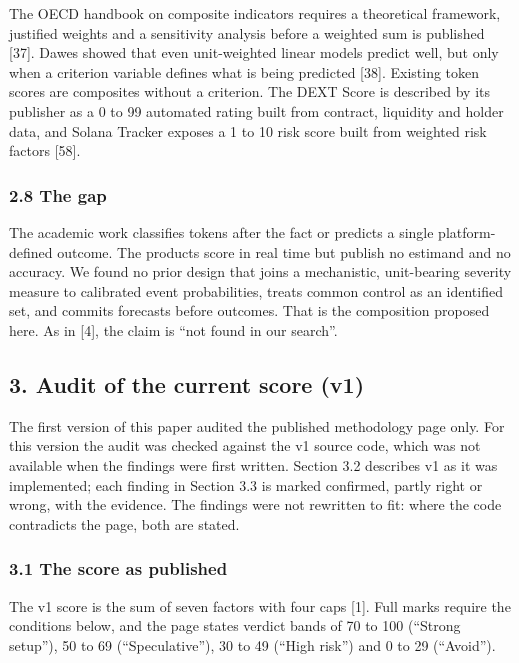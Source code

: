 The OECD handbook on composite indicators requires a theoretical framework, justified weights and a sensitivity analysis before a weighted sum is published {[}37{]}. Dawes showed that even unit-weighted linear models predict well, but only when a criterion variable defines what is being predicted {[}38{]}. Existing token scores are composites without a criterion. The DEXT Score is described by its publisher as a 0 to 99 automated rating built from contract, liquidity and holder data, and Solana Tracker exposes a 1 to 10 risk score built from weighted risk factors {[}58{]}.

\subsubsection{2.8 The gap}\label{the-gap}

The academic work classifies tokens after the fact or predicts a single platform-defined outcome. The products score in real time but publish no estimand and no accuracy. We found no prior design that joins a mechanistic, unit-bearing severity measure to calibrated event probabilities, treats common control as an identified set, and commits forecasts before outcomes. That is the composition proposed here. As in {[}4{]}, the claim is ``not found in our search''.

\subsection{3. Audit of the current score (v1)}\label{audit-of-the-current-score-v1}

The first version of this paper audited the published methodology page only. For this version the audit was checked against the v1 source code, which was not available when the findings were first written. Section 3.2 describes v1 as it was implemented; each finding in Section 3.3 is marked confirmed, partly right or wrong, with the evidence. The findings were not rewritten to fit: where the code contradicts the page, both are stated.

\subsubsection{3.1 The score as published}\label{the-score-as-published}

The v1 score is the sum of seven factors with four caps {[}1{]}. Full marks require the conditions below, and the page states verdict bands of 70 to 100 (``Strong setup''), 50 to 69 (``Speculative''), 30 to 49 (``High risk'') and 0 to 29 (``Avoid'').

